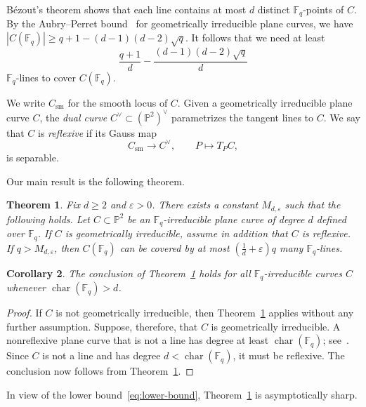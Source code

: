 \documentclass[12pt,reqno]{amsart}
\newtheorem{theorem}{Theorem}[section]
\newtheorem{corollary}[theorem]{Corollary}
\theoremstyle{definition}
\theoremstyle{remark}
\newcommand{\Fq}{\mathbb{F}_q}
\newcommand{\bP}{\mathbb{P}}
\begin{document}
B\'ezout's theorem shows that each line contains at most $d$ distinct $\Fq$-points of $C$. By the Aubry--Perret bound~\cite{AP96} for geometrically irreducible plane curves, we have $|C(\Fq)|\geq q+1-(d-1)(d-2)\sqrt q$. It follows that we need at least
\begin{equation}\label{eq:lower-bound}
\frac{q+1}{d} - \frac{(d-1)(d-2)\sqrt{q}}{d}
\end{equation}
$\Fq$-lines to cover $C(\Fq)$.

We write $C_{\mathrm{sm}}$ for the smooth locus of $C$. Given a geometrically irreducible plane curve $C$, the \emph{dual curve} $C^\vee\subset(\bP^2)^\vee$ parametrizes the tangent lines to $C$. We say that $C$ is \emph{reflexive} if its Gauss map
\[
C_{\mathrm{sm}}\longrightarrow C^\vee,
\qquad
P\longmapsto T_PC,
\]
is separable. 

Our main result is the following theorem.

\begin{theorem}\label{thm:main}
Fix $d\geq 2$ and $\varepsilon>0$. There exists a constant $M_{d,\varepsilon}$ such that the following holds. Let $C\subset\bP^2$ be an $\Fq$-irreducible plane curve of degree $d$ defined over $\Fq$. If $C$ is geometrically irreducible, assume in addition that $C$ is reflexive. If $q>M_{d,\varepsilon}$, then $C(\Fq)$ can be covered by at most $\left(\frac{1}{d}+\varepsilon\right)q$ many $\Fq$-lines.
\end{theorem}

\begin{corollary}\label{cor:large-characteristic}
The conclusion of Theorem~\ref{thm:main} holds for all $\Fq$-irreducible curves $C$ whenever $\operatorname{char}(\Fq)>d$.
\end{corollary}

\begin{proof}
If $C$ is not geometrically irreducible, then Theorem~\ref{thm:main} applies without any further assumption. Suppose, therefore, that $C$ is geometrically irreducible. A nonreflexive plane curve that is not a line has degree at least $\operatorname{char}(\Fq)$; see~\cite[p.~5]{Hef89}. Since $C$ is not a line and has degree $d<\operatorname{char}(\Fq)$, it must be reflexive. The conclusion now follows from Theorem~\ref{thm:main}.
\end{proof}

In view of the lower bound~\eqref{eq:lower-bound}, Theorem~\ref{thm:main} is asymptotically sharp.
\end{document}
